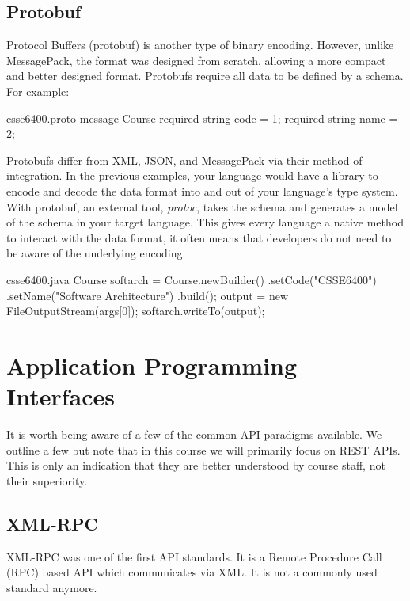 \documentclass{csse4400}
\begin{document}

\subsection{Protobuf}
Protocol Buffers (protobuf) is another type of binary encoding.
However, unlike MessagePack, the format was designed from scratch,
allowing a more compact and better designed format.
Protobufs require all data to be defined by a schema.
For example:

\begin{code}[language=protobuf]{csse6400.proto}
message Course {
    required string code = 1;
    required string name = 2;
}
\end{code}

Protobufs differ from XML, JSON, and MessagePack via their method of integration.
In the previous examples,
your language would have a library to encode and decode the data format into and out of your language's type system.
With protobuf, an external tool, \textsl{protoc},
takes the schema and generates a model of the schema in your target language.
This gives every language a native method to interact with the data format,
it often means that developers do not need to be aware of the underlying encoding.

\begin{code}[language=java]{csse6400.java}
Course softarch = Course.newBuilder()
    .setCode("CSSE6400")
    .setName("Software Architecture")
    .build();
output = new FileOutputStream(args[0]);
softarch.writeTo(output);
\end{code}

\section{Application Programming Interfaces}
It is worth being aware of a few of the common API paradigms available.
We outline a few but note that in this course we will primarily focus on REST APIs.
This is only an indication that they are better understood by course staff,
not their superiority.

\subsection{XML-RPC}
XML-RPC was one of the first API standards.
It is a Remote Procedure Call (RPC) based API which communicates via XML.
It is not a commonly used standard anymore.
\end{document}

